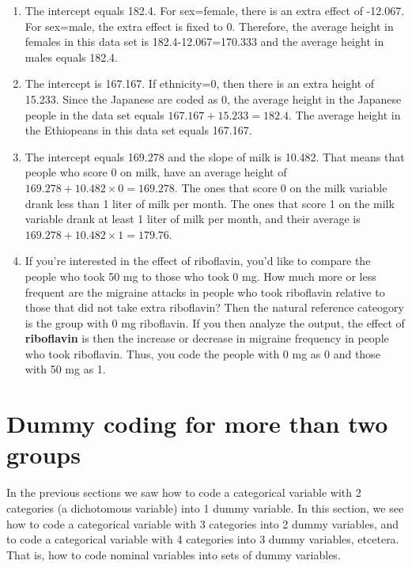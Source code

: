 \documentclass[]{report}\usepackage[]{graphicx}\usepackage[]{color}
\begin{document}
\begin{enumerate}
\item The intercept equals 182.4. For sex=female, there is an extra effect of -12.067. For sex=male, the extra effect is fixed to 0. Therefore, the average height in females in this data set is 182.4-12.067=170.333 and the average height in males equals 182.4. 

\item 
The intercept is 167.167. If ethnicity=0, then there is an extra height of 15.233. Since the 
Japanese are coded as 0, the average height in the Japanese people in the data set equals $167.167+15.233= 182.4$. The average height in the Ethiopeans in this data set equals 167.167. 

\item The intercept equals 169.278 and the slope of milk is 10.482. That means that people who score 0 on milk, have an average height of $169.278 + 10.482 \times 0 = 169.278$. The ones that score 0 on the milk variable drank less than 1 liter of milk per month. The ones that score 1 on the milk variable drank at least 1 liter of milk per month, and their average is $169.278 + 10.482 \times 1 = 179.76$.

\item If you're interested in the effect of riboflavin, you'd like to compare the people who took 50 mg to those who took 0 mg. How much more or less frequent are the migraine attacks in people who took riboflavin relative to those that did not take extra riboflavin? Then the natural reference cateogory is the group with 0 mg riboflavin. If you then analyze the output, the effect of \textbf{riboflavin} is then the increase or decrease in migraine frequency in people who took riboflavin. Thus, you code the people with 0 mg as 0 and those with 50 mg as 1.

\end{enumerate}



\section{Dummy coding for more than two groups}

In the previous sections we saw how to code a categorical variable with 2 categories (a dichotomous variable) into 1 dummy variable. In this section, we see how to code a categorical variable with 3 categories into 2 dummy variables, and to code a categorical variable with 4 categories into 3 dummy variables, etcetera. That is, how to code nominal variables into sets of dummy variables.
\end{document}
